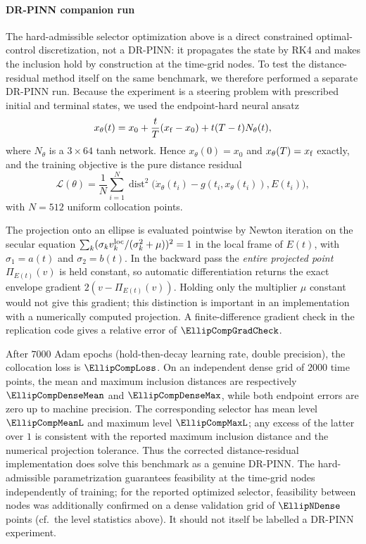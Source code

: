 \documentclass[11pt]{elsarticle}
\theoremstyle{definition}
\theoremstyle{remark}
\numberwithin{equation}{section}
\def\dist{\operatorname{dist}}
\begin{document}
\paragraph{DR-PINN companion run}
The hard-admissible selector optimization above is a direct constrained
optimal-control discretization, not a DR-PINN: it propagates the state by RK4
and makes the inclusion hold by construction at the time-grid nodes. To test the distance-residual
method itself on the same benchmark, we therefore performed a separate
DR-PINN run. Because the experiment is a steering problem with prescribed
initial and terminal states, we used the endpoint-hard neural ansatz
\begin{equation}
\label{eq:ellipse-endpoint-hard}
 x_\theta(t)
 =x_0+\frac{t}{T}(x_{\rm f}-x_0)+t(T-t)N_\theta(t),
\end{equation}
where $N_\theta$ is a $3\times64$ tanh network. Hence
$x_\theta(0)=x_0$ and $x_\theta(T)=x_{\rm f}$ exactly, and the training
objective is the pure distance residual
\begin{equation}
\label{eq:ellipse-drpinn-loss}
 \mathcal{L}(\theta)
 =\frac{1}{N}\sum_{i=1}^{N}
 \dist^2\!\bigl(\dot{x}_\theta(t_i)-g(t_i,x_\theta(t_i)),E(t_i)\bigr),
\end{equation}
with $N=512$ uniform collocation points.

The projection onto an ellipse is evaluated pointwise by Newton iteration on
the secular equation
$\sum_k(\sigma_k v_k^{\rm loc}/(\sigma_k^2+\mu))^2=1$ in the local frame of
$E(t)$, with $\sigma_1=a(t)$ and $\sigma_2=b(t)$. In the backward pass the
\emph{entire projected point} $\Pi_{E(t)}(v)$ is held constant, so automatic
differentiation returns the exact envelope gradient
$2(v-\Pi_{E(t)}(v))$. Holding only the multiplier $\mu$ constant would not
give this gradient; this distinction is important in an implementation with
a numerically computed projection. A finite-difference gradient check in the
replication code gives a relative error of $\EllipCompGradCheck$.

After $7000$ Adam epochs (hold-then-decay learning rate, double precision),
the collocation loss is $\EllipCompLoss$. On an independent dense grid of
$2000$ time points, the mean and maximum inclusion distances are respectively
$\EllipCompDenseMean$ and $\EllipCompDenseMax$, while both endpoint errors are zero
up to machine precision. The corresponding selector has mean level $\EllipCompMeanL$
and maximum level $\EllipCompMaxL$; any excess of the latter over $1$ is
consistent with the reported maximum inclusion distance and the numerical
projection tolerance. Thus
the corrected distance-residual implementation does solve this benchmark as
a genuine DR-PINN. The hard-admissible parametrization guarantees
feasibility at the time-grid nodes independently of training; for the
reported optimized selector, feasibility between nodes was additionally
confirmed on a dense validation grid of $\EllipNDense$ points (cf.\ the level
statistics above). It should not itself be labelled a DR-PINN experiment.
\end{document}
